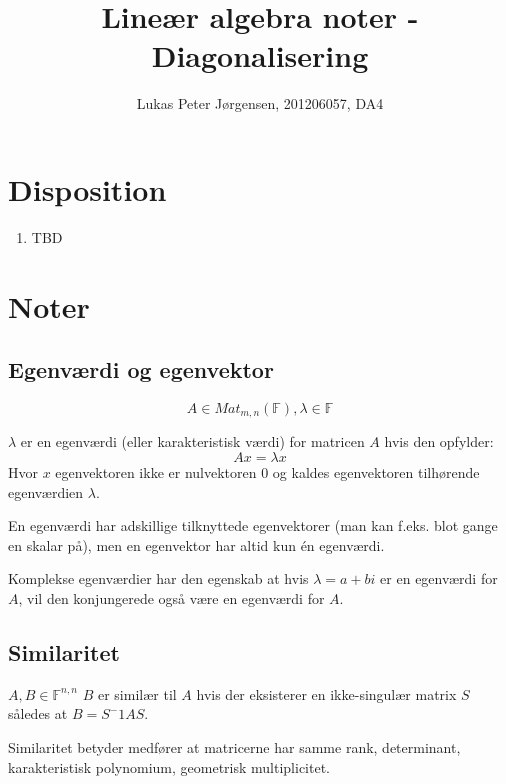 \documentclass[a4paper,oneside,article]{memoir}
\begin{document}
    \title{Lineær algebra noter - Diagonalisering}
    \author{Lukas Peter Jørgensen, 201206057, DA4
            }
    \maketitle
    
    \tableofcontents
        
    \chapter{Disposition}
    \begin{enumerate}
    \item TBD
    \end{enumerate}
    
	\chapter{Noter}
	
	\section{Egenværdi og egenvektor}
	$$A\in Mat_{m,n}(\mathbb{F}), \lambda \in \mathbb{F}$$
	
	$\lambda$ er en egenværdi (eller karakteristisk værdi) for matricen 
	$A$ hvis den opfylder:
	$$Ax=\lambda x$$
	Hvor $x$ egenvektoren ikke er nulvektoren $0$ og kaldes egenvektoren 
	tilhørende egenværdien $\lambda$.
	
	En egenværdi har adskillige tilknyttede egenvektorer (man kan f.eks. 
	blot gange en skalar på), men en egenvektor har altid kun én egenværdi. 
	
	Komplekse egenværdier har den egenskab at hvis $\lambda = a+bi$ er en
	egenværdi for $A$, vil den konjungerede også være en egenværdi for $A$.
	
	\section{Similaritet}
	$A,B\in \mathbb{F}^{n,n}$ $B$ er similær til $A$ hvis der eksisterer
	en ikke-singulær matrix $S$ således at $B=S^-1AS$.
	
	Similaritet betyder medfører at matricerne har samme rank, determinant,
	karakteristisk polynomium, geometrisk multiplicitet.
	
\end{document}

